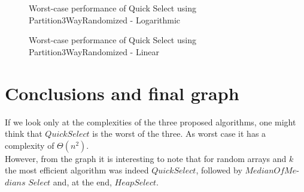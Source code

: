 \documentclass{article}
\begin{document}
\begin{figure}[H]   
  \caption{Worst-case performance of Quick Select using Partition3WayRandomized - Logarithmic}
\end{figure}
\begin{figure}[H]   
  \caption{Worst-case performance of Quick Select using Partition3WayRandomized - Linear}
\end{figure}


\section{Conclusions and final graph}
If we look only at the complexities of the three proposed algorithms, one might think that $QuickSelect$ is the worst of the three. As worst case it has a complexity of $\Theta(n^2)$.\\ However, from the graph it is interesting to note that for random arrays and $k$ the most efficient algorithm was indeed $QuickSelect$, followed by $MedianOfMe$-$dians$ $Select$ and, at the end, $HeapSelect$.
\end{document}
